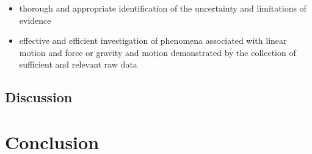 \documentclass[12pt,a4paper]{article}
\begin{document}
\begin{itemize}
\begin{itemize}
	
	
	\item thorough and appropriate identification of the uncertainty and limitations of evidence
	
	
	
	
	
	\item effective and efficient investigation of phenomena associated with linear motion and force or gravity and motion demonstrated by the collection of sufficient and relevant raw data
\end{itemize}
\end{itemize}



\subsection{Discussion}


\section{Conclusion}

	
	
	
\end{document}
